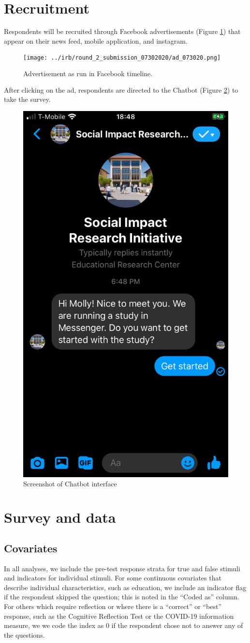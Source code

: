 \documentclass[letterpaper, 12pt, parskip=full,DIV=10]{scrartcl}
\begin{document}
\clearpage


\clearpage
\appendix

\section{Recruitment}\label{appendix:recruitment}
Respondents will be recruited through Facebook advertisements (Figure \ref{fig:ad}) that appear on their news feed, mobile application, and instagram. 

\begin{figure}[htb]
\centering
\caption{Advertisement as run in Facebook timeline.}
\label{fig:ad}
\texttt{[image: ../irb/round\_2\_submission\_07302020/ad\_073020.png]}
\end{figure}

After clicking on the ad, respondents are directed to the Chatbot (Figure \ref{fig:chatbot}) to take the survey.

\begin{figure}[htb]
\centering
\caption{Screenshot of Chatbot interface}
\label{fig:chatbot}
\includegraphics[width=.25\textwidth]{figures/chatbot_image.png}
\end{figure}

\section{Survey and data}\label{appendix:data}
\subsection{Covariates}\label{appendix:covariates}


In all analyses, we include the pre-test response strata for true and false stimuli and indicators for individual stimuli.
For some continuous covariates that describe individual characteristics, such as education, we include an indicator flag if the respondent skipped the question; this is noted in the ``Coded as'' column. For others which require reflection or where there is a ``correct'' or ``best'' response, such as the Cognitive Reflection Test or the COVID-19 information measure, we we code the index as 0 if the respondent chose not to answer any of the questions. 
\end{document}
